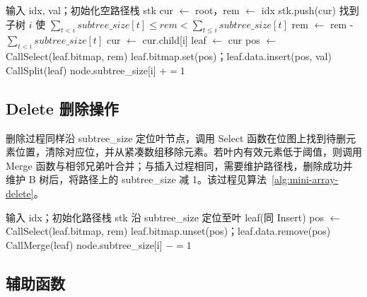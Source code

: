 \begin{algorithm}[htbp]
  \caption{mini-array.Insert}
  \label{alg:mini-array-insert}
  \begin{algorithmic}[1]
    \State 输入 idx, val；初始化空路径栈 stk
    \State cur $\gets$ root，rem $\gets$ idx
      \State stk.push(cur)
      \State 找到子树 $i$ 使 $\displaystyle\sum_{t<i}\mathit{subtree\_size}[t]\le \mathit{rem}<\sum_{t\le i}\mathit{subtree\_size}[t]$
      \State rem $\gets$ rem - $\displaystyle\sum_{t<i}\mathit{subtree\_size}[t]$
      \State cur $\gets$ cur.child[i]
    \EndWhile
    \State leaf $\gets$ cur
    \State pos $\gets$ Call{Select}(leaf.bitmap, rem)
    \State leaf.bitmap.set(pos)；leaf.data.insert(pos, val)
      \State Call{Split}(leaf)
    \EndIf
      \State node.subtree\_size[i] $\mathrel{+}=1$
    \EndFor
  \end{algorithmic}
\end{algorithm}

\subsection{Delete 删除操作}

删除过程同样沿 subtree\_size 定位叶节点，调用 Select 函数在位图上找到待删元素位置，清除对应位，并从紧凑数组移除元素。若叶内有效元素低于阈值，则调用 Merge 函数与相邻兄弟叶合并；与插入过程相同，需要维护路径栈，删除成功并维护 B 树后，将路径上的 subtree\_size 减 1。该过程见算法~\ref{alg:mini-array-delete}。

\begin{algorithm}[htbp]
  \caption{mini-array.Delete}
  \label{alg:mini-array-delete}
  \begin{algorithmic}[1]
    \State 输入 idx；初始化路径栈 stk
    \State 沿 subtree\_size 定位至叶 leaf(同 Insert)
    \State pos $\gets$ Call{Select}(leaf.bitmap, rem)
    \State leaf.bitmap.unset(pos)；leaf.data.remove(pos)
      \State Call{Merge}(leaf)
    \EndIf
      \State node.subtree\_size[i] $\mathrel{-}=1$
    \EndFor
  \end{algorithmic}
\end{algorithm}

\subsection{辅助函数}

